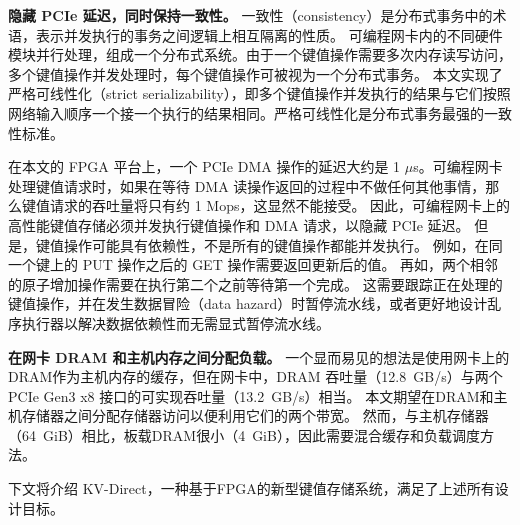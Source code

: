 \textbf {隐藏 PCIe 延迟，同时保持一致性。}
一致性（consistency）是分布式事务中的术语，表示并发执行的事务之间逻辑上相互隔离的性质。
可编程网卡内的不同硬件模块并行处理，组成一个分布式系统。由于一个键值操作需要多次内存读写访问，多个键值操作并发处理时，每个键值操作可被视为一个分布式事务。
本文实现了严格可线性化（strict serializability），即多个键值操作并发执行的结果与它们按照网络输入顺序一个接一个执行的结果相同。严格可线性化是分布式事务最强的一致性标准。

在本文的 FPGA 平台上，一个 PCIe DMA 操作的延迟大约是 1 $\mu$s。可编程网卡处理键值请求时，如果在等待 DMA 读操作返回的过程中不做任何其他事情，那么键值请求的吞吐量将只有约 1 Mops，这显然不能接受。
因此，可编程网卡上的高性能键值存储必须并发执行键值操作和 DMA 请求，以隐藏 PCIe 延迟。
但是，键值操作可能具有依赖性，不是所有的键值操作都能并发执行。
例如，在同一个键上的 PUT 操作之后的 GET 操作需要返回更新后的值。
再如，两个相邻的原子增加操作需要在执行第二个之前等待第一个完成。
这需要跟踪正在处理的键值操作，并在发生数据冒险（data hazard）时暂停流水线，或者更好地设计乱序执行器以解决数据依赖性而无需显式暂停流水线。


\textbf {在网卡 DRAM 和主机内存之间分配负载。}
一个显而易见的想法是使用网卡上的DRAM作为主机内存的缓存，但在网卡中，DRAM 吞吐量（12.8~GB/s）与两个 PCIe Gen3 x8 接口的可实现吞吐量（13.2~GB/s）相当。 
本文期望在DRAM和主机存储器之间分配存储器访问以便利用它们的两个带宽。
然而，与主机存储器（64~GiB）相比，板载DRAM很小（4~GiB），因此需要混合缓存和负载调度方法。

下文将介绍 KV-Direct，一种基于FPGA的新型键值存储系统，满足了上述所有设计目标。
